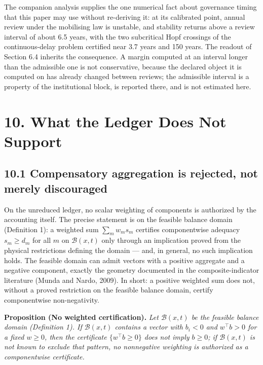 \documentclass[11pt]{article}
\begin{document}
The companion analysis supplies the one numerical fact about governance timing that this paper may use without re-deriving it: at its calibrated point, annual review under the mobilising law is unstable, and stability returns above a review interval of about 6.5 years, with the two subcritical Hopf crossings of the continuous-delay problem certified near 3.7 years and 150 years. The readout of Section 6.4 inherits the consequence. A margin computed at an interval longer than the admissible one is not conservative, because the declared object it is computed on has already changed between reviews; the admissible interval is a property of the institutional block, is reported there, and is not estimated here.

\vspace{0.8em}

\section*{10. What the Ledger Does Not Support}\label{10-what-the-ledger-does-not-support}

\subsection*{10.1 Compensatory aggregation is rejected, not merely discouraged}\label{101-compensatory-aggregation-is-rejected-not-merely-discouraged}

On the unreduced ledger, no scalar weighting of components is authorized by the accounting itself. The precise statement is on the feasible balance domain (Definition 1): a weighted sum \(\sum_m w_m s_m\) certifies componentwise adequacy \(s_m \ge d_m\) for all \(m\) on \(\mathcal{B}(x,t)\) only through an implication proved from the physical restrictions defining the domain --- and, in general, no such implication holds. The feasible domain can admit vectors with a positive aggregate and a negative component, exactly the geometry documented in the composite-indicator literature (Munda and Nardo, 2009). In short: a positive weighted sum does not, without a proved restriction on the feasible balance domain, certify componentwise non-negativity.

\textbf{Proposition (No weighted certification).} \emph{Let \(\mathcal{B}(x,t)\) be the feasible balance domain (Definition 1). If \(\mathcal{B}(x,t)\) contains a vector with \(b_i < 0\) and \(w^\top b > 0\) for a fixed \(w \ge 0\), then the certificate \(\{w^\top b \ge 0\}\) does not imply \(b \ge 0\); if \(\mathcal{B}(x,t)\) is not known to exclude that pattern, no nonnegative weighting is authorized as a componentwise certificate.}
\end{document}
